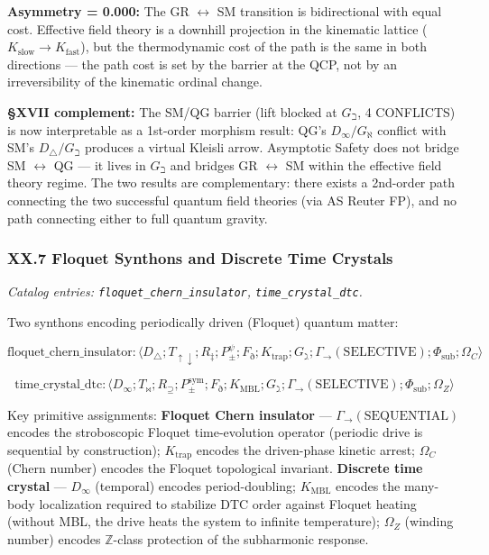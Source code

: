 \documentclass[12pt,a4paper]{article}
\begin{document}
\textbf{Asymmetry = 0.000:} The GR $\leftrightarrow$ SM transition is bidirectional with equal cost. Effective field theory is a downhill projection in the kinematic lattice ($K_{\text{slow}} \to K_{\text{fast}}$), but the thermodynamic cost of the path is the same in both directions --- the path cost is set by the barrier at the QCP, not by an irreversibility of the kinematic ordinal change.

\textbf{§XVII complement:} The SM/QG barrier (lift blocked at $G_{\beth}$, 4 CONFLICTS) is now interpretable as a 1st-order morphism result: QG's $D_{\infty}/G_{\aleph}$ conflict with SM's $D_{\bigtriangleup}/G_{\beth}$ produces a virtual Kleisli arrow. Asymptotic Safety does not bridge SM $\leftrightarrow$ QG --- it lives in $G_{\beth}$ and bridges GR $\leftrightarrow$ SM within the effective field theory regime. The two results are complementary: there exists a 2nd-order path connecting the two successful quantum field theories (via AS Reuter FP), and no path connecting either to full quantum gravity.

\subsubsection{XX.7 Floquet Synthons and Discrete Time Crystals}

\emph{Catalog entries: \texttt{floquet\_chern\_insulator}, \texttt{time\_crystal\_dtc}.}

Two synthons encoding periodically driven (Floquet) quantum matter:

\[\text{floquet\_chern\_insulator}: \langle D_{\bigtriangleup}; T_{\uparrow\downarrow}; R_{\ddagger}; P_{\pm}^{\psi}; F_{\eth}; K_{\text{trap}}; G_{\gimel}; \Gamma_{\to}(\text{SELECTIVE}); \Phi_{\text{sub}}; \Omega_C \rangle\]

\[\text{time\_crystal\_dtc}: \langle D_{\infty}; T_{\bowtie}; R_{\supseteq}; P_{\pm}^{\text{sym}}; F_{\eth}; K_{\text{MBL}}; G_{\gimel}; \Gamma_{\to}(\text{SELECTIVE}); \Phi_{\text{sub}}; \Omega_Z \rangle\]

Key primitive assignments: \textbf{Floquet Chern insulator} --- $\Gamma_{\to}(\text{SEQUENTIAL})$ encodes the stroboscopic Floquet time-evolution operator (periodic drive is sequential by construction); $K_{\text{trap}}$ encodes the driven-phase kinetic arrest; $\Omega_C$ (Chern number) encodes the Floquet topological invariant. \textbf{Discrete time crystal} --- $D_{\infty}$ (temporal) encodes period-doubling; $K_{\text{MBL}}$ encodes the many-body localization required to stabilize DTC order against Floquet heating (without MBL, the drive heats the system to infinite temperature); $\Omega_Z$ (winding number) encodes $\mathbb{Z}$-class protection of the subharmonic response.
\end{document}
